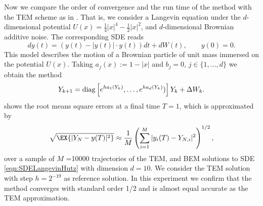 \begin{example}
	Now we compare the order of convergence and the run time of the \SM method with the TEM scheme as in 
	\cite{Hutzenthaler2012a}. That is, we consider a  Langevin equation under  the $d$-dimensional potential 
	$U(x)= \frac{1}{4}|x|^4 - \frac{1}{2}|x|^2$, and $d$-dimensional Brownian additive noise. The corresponding
	SDE reads
	\begin{equation}\label{eqn:SDELangevinHutz}
	dy(t) = 
		\left(
			y(t) - |y(t)| \cdot y(t)
		\right)dt
		+ dW(t), \qquad y(0)=0.
	\end{equation}
	This model describes the motion of a Brownian particle of unit mass immersed on the potential $U(x)$. 
	Taking $a_j(x):=1-|x|$ and $b_j=0$, $j\in \{1,\dots, d\}$ we obtain the \SM method
	\begin{equation}\label{eqn:LangevinLSMethod}
		Y_{k+1} = \operatorname{diag}
		\left[		
			e^{h a_1(Y_k)}, \dots, e^{ha_d(Y_k)}) 
		\right] 
		Y_k+
		\Delta W_k.
	\end{equation}
	 shows the root means square errors at a final time $T=1$, which is approximated by
	\begin{equation}
		\sqrt{\EX{|Y_N - y(T)|^2}} \approx 
		\frac{1}{M}
		\left(
		\sum_{i=1}^M
		|y_i(T) - Y_{N,i}|^2	
		\right)^{1/2},
	\end{equation}
	over a sample of $M$ =\num{10000} trajectories of the TEM, \SM  and BEM solutions to SDE 
	\eqref{eqn:SDELangevinHutz} with dimension $d=10$.  We consider the TEM solution with step $h=2^{-19}$ as reference 
	solution. 
	In this experiment we confirm that the \SM method converges with standard order 1/2  and is almost equal accurate 
	as the TEM approximation.


\end{example}
